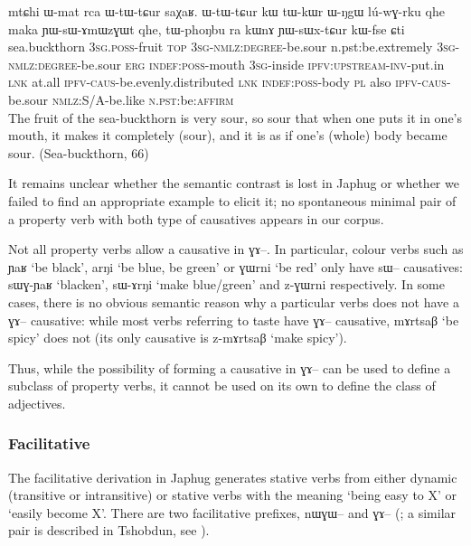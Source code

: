 \documentclass[oldfontcommands,oneside,a4paper,11pt]{article}
\newcommand{\ipa}[1]{{\phon \mbox{#1}}} %
\begin{document}
\begin{exe}
\ex \label{ex:YWsWxtCur}
\gll 
\ipa{mtɕhi}  	\ipa{ɯ-mat}  	\ipa{rca}  	\ipa{ɯ-tɯ-tɕur}  	\ipa{saχaʁ.}  	\ipa{ɯ-tɯ-tɕur}  	\ipa{kɯ}  	\ipa{tɯ-kɯr}  	\ipa{ɯ-ŋgɯ}  	\ipa{lú-wɣ-rku}  	\ipa{qhe}  	\ipa{maka}  	\ipa{ɲɯ-sɯ-ɤmɯzɣɯt}  	\ipa{qhe,}  	\ipa{tɯ-phoŋbu}  	\ipa{ra}  	\ipa{kɯnɤ}  	\ipa{ɲɯ-sɯx-tɕur}  	\ipa{kɯ-fse}  	\ipa{ɕti}  \\
sea.buckthorn \textsc{3sg.poss}-fruit \textsc{top} \textsc{3sg-nmlz:degree}-be.sour n.pst:be.extremely \textsc{3sg-nmlz:degree}-be.sour \textsc{erg} \textsc{indef:poss}-mouth \textsc{3sg}-inside \textsc{ipfv:upstream-inv}-put.in \textsc{lnk} at.all \textsc{ipfv-caus}-be.evenly.distributed \textsc{lnk} \textsc{indef:poss}-body \textsc{pl} also \textsc{ipfv-caus}-be.sour \textsc{nmlz:S/A}-be.like \textsc{n.pst}:be:\textsc{affirm} \\
\glt The fruit of the sea-buckthorn is very sour, so sour that when one puts it in one's mouth, it makes it completely (sour), and it is as if one's (whole) body became sour. (Sea-buckthorn, 66)
\end{exe}

It remains unclear whether the semantic contrast is lost in Japhug or whether we failed to find an appropriate example to elicit it; no spontaneous minimal pair of a property verb with both type of causatives appears in our corpus.

Not all property verbs allow a causative in \ipa{ɣɤ--}. In particular, colour verbs such as  \ipa{ɲaʁ}  `be black', \ipa{arŋi} `be blue, be green' or \ipa{ɣɯrni} `be red' only have \ipa{sɯ--} causatives: \ipa{sɯɣ-ɲaʁ} `blacken', \ipa{sɯ-ɤrŋi} `make blue/green' and \ipa{z-ɣɯrni} respectively. In some cases, there is no obvious semantic reason why a particular verbs does not have a \ipa{ɣɤ--} causative: while most verbs referring to taste have \ipa{ɣɤ--} causative, \ipa{mɤrtsaβ} `be spicy' does not (its only causative is \ipa{z-mɤrtsaβ} `make spicy').

Thus, while the possibility of forming a causative in \ipa{ɣɤ--} can be used to define a subclass of property verbs, it cannot be used on its own to define the class of adjectives.

\subsubsection{Facilitative}
The facilitative derivation in Japhug generates stative verbs from either dynamic (transitive or intransitive) or stative verbs with the meaning `being easy to X' or  `easily become X'. There are two facilitative prefixes, \ipa{nɯɣɯ--} and \ipa{ɣɤ--} (\citealt[82]{jacques08zh}; a similar pair is described in Tshobdun, see \citealt{jackson13morpho}).
\end{document}
